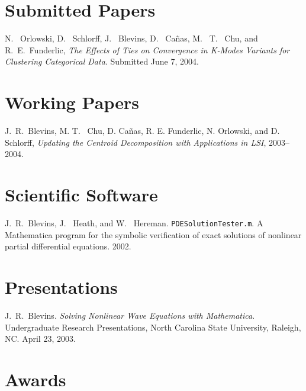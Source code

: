 \documentclass[overlapped,line,draft,11pt,letterpaper]{res}
\begin{document}
\begin{resume}

\section{\bf Submitted Papers}

N. \ Orlowski, D. \ Schlorff, J. \ Blevins, D. \ Ca\~{n}as, M. \ T. \
Chu, and R.\ E.\ Funderlic, {\em The Effects of Ties on Convergence in
  K-Modes Variants for Clustering Categorical Data}. Submitted June 7,
2004.


\section{\bf Working Papers}

J.\ R.\ Blevins, M. T. \ Chu, D. Ca\~{n}as, R. E. Funderlic, N.
Orlowski, and D. Schlorff, {\em Updating the Centroid Decomposition
  with Applications in LSI}, 2003--2004.


\section{\bf Scientific Software}

J.\ R.\ Blevins, J. \ Heath, and W. \ Hereman.
\texttt{PDESolutionTester.m}.  A Mathematica program for the symbolic
verification of exact solutions of nonlinear partial differential
equations. 2002.


\section{\bf Presentations}

J.\ R.\ Blevins. {\em Solving Nonlinear Wave Equations with
  Mathematica}. Undergraduate Research Presentations, North Carolina
State University, Raleigh, NC. April 23, 2003.



\section{\bf Awards}


\end{resume}
\end{document}
